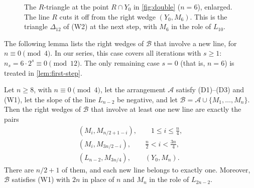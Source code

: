 \begin{figure}[H]
\centering
\resizebox{\ifdim\width>\linewidth\linewidth\else\width\fi}{!}{}
\caption{The $R$-triangle at the point $R\cap Y_0$ in \cref{fig:double} ($n=6$), enlarged. The line $R$ cuts it off from the right wedge $(Y_0,M_6)$. This is the triangle $\Delta_{12}$ of \textup{(W2)} at the next step, with $M_6$ in the role of $L_{10}$.}
\label{fig:double-zoom}
\end{figure}

The following lemma lists the right wedges of $\mathcal B$ that involve a new line, for $n\equiv0\pmod4$.
In our series, this case covers all iterations with $s\ge1$: $n_s=6\cdot2^s\equiv0\pmod{12}$.
The only remaining case $s=0$ (that is, $n=6$) is treated in \cref{lem:first-step}.

\begin{lemma}\label{lem:right-wedges}
Let $n\ge8$, with $n\equiv0\pmod4$, let the arrangement $\mathcal A$ satisfy \textup{(D1)--(D3)} and \textup{(W1)}, let the slope of the line $L_{n-2}$ be negative, and let $\mathcal B=\mathcal A\cup\{M_1,\ldots,M_n\}$.
Then the right wedges of $\mathcal B$ that involve at least one new line are exactly the pairs
\begin{gather}
(M_i, M_{n/2+1-i}),
\qquad 1\le i\le\frac n4,\label{eq:wedges-low}\\
(M_i,M_{3n/2-i}),
\qquad \frac n2<i<\frac{3n}{4},\label{eq:wedges-high}\\
(L_{n-2},M_{3n/4}),
\qquad
(Y_0,M_n).\label{eq:wedges-old}
\end{gather}
There are $n/2+1$ of them, and each new line belongs to exactly one.
Moreover, $\mathcal B$ satisfies \textup{(W1)} with $2n$ in place of $n$ and $M_n$ in the role of $L_{2n-2}$.
\end{lemma}

